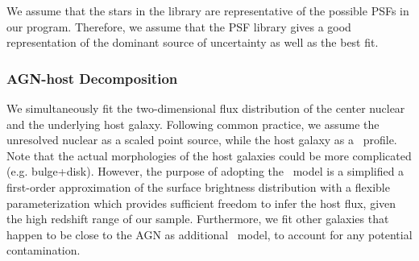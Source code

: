 \documentclass[apj]{emulateapj}
\begin{document}
We assume that the stars in the library are representative of the possible PSFs in our program. Therefore, we assume that the PSF library gives a good representation of the dominant source of uncertainty as well as the best fit.

\subsubsection{AGN-host Decomposition}
We simultaneously fit the two-dimensional flux distribution of the center nuclear and the underlying host galaxy. Following common practice, we assume the unresolved nuclear as a scaled point source, while the host galaxy as a \sersic\ profile. Note that the actual morphologies of the host galaxies could be more complicated (e.g. bulge+disk). However, the purpose of adopting the \sersic\ model is a simplified a first-order approximation of the surface brightness distribution with a flexible parameterization which provides sufficient freedom to infer the host flux, given the high redshift range of our sample. Furthermore, we fit other galaxies that happen to be close to the AGN as additional \sersic\ model, to account for any potential contamination.
\end{document}
